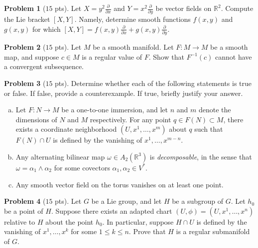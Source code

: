 \documentclass{amsart}
\newcommand{\+}[1]{\ensuremath{\mathbf{#1}}}
\newcommand{\R}{{\mathbb R}}
\theoremstyle{definition}
\newtheorem{prob}{Problem}
\begin{document}
\begin{prob}[$15$ pts]
Let $X = y^2 \frac{\partial}{\partial x}$ and $Y = x^2 \frac{\partial}{\partial y}$
be vector fields on $\R^2$.
Compute the Lie bracket $[X,Y]$.  Namely, determine smooth functions $f(x,y)$ and $g(x,y)$ for which
 $[X,Y] = f(x,y) \frac{\partial}{\partial x} + g(x,y) \frac{\partial}{\partial y}$.
\end{prob}


\vspace{3mm}

\begin{prob}[$15$ pts]
 Let $M$ be a smooth manifold.  Let $F: M \to M$ be  a smooth map, and suppose $c \in M$ is a  regular value of $F$.
 Show that $F^{-1}(c)$ cannot have a convergent subsequence.
\end{prob}


\vspace{3mm}

\begin{prob}[$15$ pts]
Determine whether each of the following statements is true or false.  If false, provide a counterexample.  If true, briefly justify your answer.
\begin{enumerate}[(a)]
 \item Let $F: N \to M$ be a one-to-one immersion, and let $n$ and $m$ denote the dimensions of $N$ and $M$ respectively.
 For any point $q \in F(N) \subset M$, there exists a coordinate neighborhood $(U, x^1, \ldots, x^m)$ about $q$ such that
 $F(N) \cap U$ is defined by the vanishing of $x^1, \ldots, x^{m-n}$.
 \item Any alternating bilinear map $\omega \in A_2(\R^3)$ is \emph{decomposable}, 
 in the sense that $\omega = \alpha_1 \wedge \alpha_2$ for some
 covectors $\alpha_1, \alpha_2 \in V^*$.
  \item Any smooth vector field on the torus vanishes on at least one point.
\end{enumerate}

\end{prob}


\vspace{3mm}

\begin{prob}[$15$ pts]
Let $G$ be a Lie group, and let $H$ be a subgroup of $G$.  Let $h_0$ be a point of $H$.
Suppose there exists an adapted chart $(U, \phi) = (U, x^1, \ldots, x^n)$ relative to $H$ about the point $h_0$.
In particular, suppose $H \cap U$ is defined by the vanishing of $x^1, \ldots, x^k$ for some
$1 \leq k \leq n$.  Prove that $H$ is a regular submanifold of $G$.
\end{prob}
\end{document}
